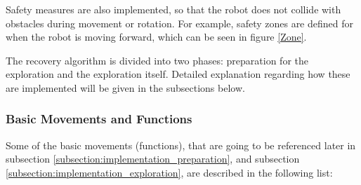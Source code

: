 Safety measures are also implemented, so that the robot does not collide with obstacles during movement or rotation. For example, safety zones are defined for when the robot is moving forward, which can be seen in figure \ref{Zone}.

The recovery algorithm is divided into two phases: preparation for the exploration and the exploration itself. Detailed explanation regarding how these are implemented will be given in the subsections below.

\subsubsection{Basic Movements and Functions}
Some of the basic movements (functions), that are going to be referenced later in subsection \ref{subsection:implementation_preparation}, and subsection \ref{subsection:implementation_exploration}, are described in the following list:

